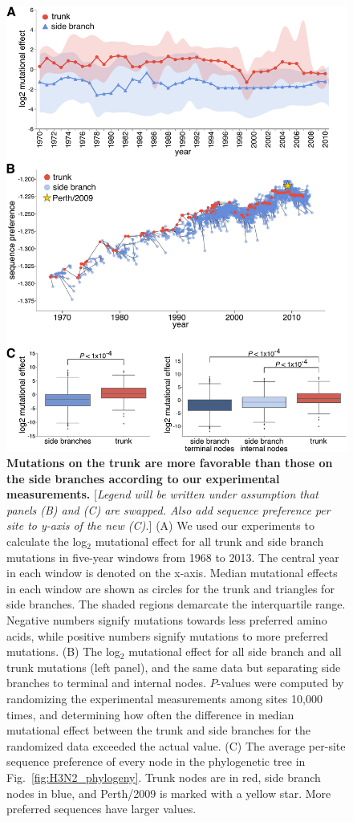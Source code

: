 \documentclass[9pt,twocolumn,twoside]{pnas-new}
\newcommand{\comment}[1]{{\color{red}[\textsl{#1}]}}
\begin{document}
\begin{figure}
\centering
\includegraphics[width=\columnwidth]{figs/trunkvssidebranch/trunkvssidebranch.pdf}
\caption{\label{fig:trunkvssidebranch}
{\bf Mutations on the trunk are more favorable than those on the side branches according to our experimental measurements.}
\comment{Legend will be written under assumption that panels (B) and (C) are swapped. Also add sequence preference \emph{per site} to y-axis of the new (C).}
(A) We used our experiments to calculate the log$_{2}$ mutational effect for all trunk and side branch mutations in five-year windows from 1968 to 2013. 
The central year in each window is denoted on the x-axis.
Median mutational effects in each window are shown as circles for the trunk and triangles for side branches. 
The shaded regions demarcate the interquartile range.
Negative numbers signify mutations towards less preferred amino acids, while positive numbers signify mutations to more preferred mutations.
(B) The log$_{2}$ mutational effect for all side branch and all trunk mutations (left panel), and the same data but separating side branches to terminal and internal nodes.
$P$-values were computed by randomizing the experimental measurements among sites 10,000 times, and determining how often the difference in median mutational effect between the trunk and side branches for the randomized data exceeded the actual value.
(C) The average per-site sequence preference of every node in the phylogenetic tree in Fig.~\ref{fig:H3N2_phylogeny}.
Trunk nodes are in red, side branch nodes in blue, and Perth/2009 is marked with a yellow star.
More preferred sequences have larger values.
}
\end{figure}
\end{document}
